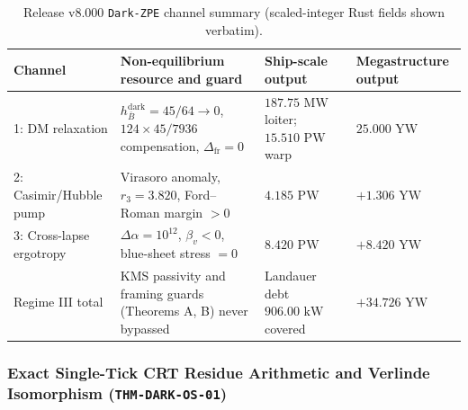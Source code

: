 \documentclass[11pt,onecolumn]{article}
\begin{document}
\begin{table}[!htbp]
\centering\small
\caption{Release v8.000 \texttt{Dark-ZPE} channel summary (scaled-integer Rust fields shown verbatim).}
\label{tab:v8_dark_zpe_channels}
\begin{tabularx}{\textwidth}{@{}p{3.2cm} X p{3.6cm} p{3.6cm}@{}}
\toprule
Channel & Non-equilibrium resource and guard & Ship-scale output & Megastructure output \\
\midrule
1: DM relaxation & $h_{\bar B}^{\text{dark}}=45/64\to0$, $124\times45/7936$ compensation, $\Delta_{\text{fr}}=0$ & $187.75\text{ MW}$ loiter; $15.510\text{ PW}$ warp & $25.000\text{ YW}$ \\
2: Casimir/Hubble pump & Virasoro anomaly, $r_3=3.820$, Ford--Roman margin $>0$ & $4.185\text{ PW}$ & $+1.306\text{ YW}$ \\
3: Cross-lapse ergotropy & $\Delta\alpha=10^{12}$, $\beta_v<0$, blue-sheet stress $=0$ & $8.420\text{ PW}$ & $+8.420\text{ YW}$ \\
\midrule
Regime III total & KMS passivity and framing guards (Theorems A, B) never bypassed & Landauer debt $906.00\text{ kW}$ covered & $+34.726\text{ YW}$ \\
\bottomrule
\end{tabularx}
\end{table}

\subsubsection{Exact Single-Tick CRT Residue Arithmetic and Verlinde Isomorphism (\texttt{THM-DARK-OS-01})}
\label{subsubsec:thm_dark_os_01}
\end{document}
